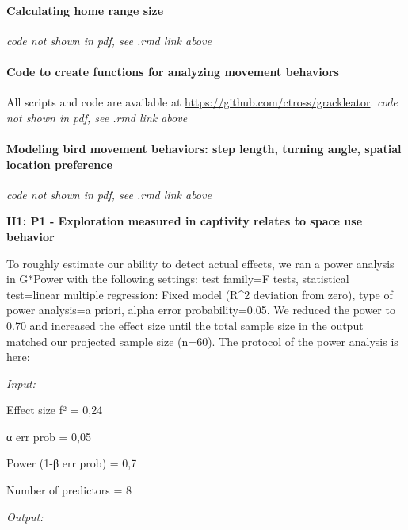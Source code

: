 \documentclass[
]{article}
\begin{document}
\hypertarget{calculating-home-range-size}{%
\paragraph{Calculating home range
size}\label{calculating-home-range-size}}

\emph{code not shown in pdf, see .rmd link above}

\hypertarget{code-to-create-functions-for-analyzing-movement-behaviors}{%
\paragraph{Code to create functions for analyzing movement
behaviors}\label{code-to-create-functions-for-analyzing-movement-behaviors}}

All scripts and code are available at
\url{https://github.com/ctross/grackleator}. \emph{code not shown in
pdf, see .rmd link above}

\hypertarget{modeling-bird-movement-behaviors-step-length-turning-angle-spatial-location-preference}{%
\paragraph{Modeling bird movement behaviors: step length, turning angle,
spatial location
preference}\label{modeling-bird-movement-behaviors-step-length-turning-angle-spatial-location-preference}}

\emph{code not shown in pdf, see .rmd link above}

\textbf{H1: P1 - Exploration measured in captivity relates to space use
behavior}

To roughly estimate our ability to detect actual effects, we ran a power
analysis in G*Power with the following settings: test family=F tests,
statistical test=linear multiple regression: Fixed model (R\^{}2
deviation from zero), type of power analysis=a priori, alpha error
probability=0.05. We reduced the power to 0.70 and increased the effect
size until the total sample size in the output matched our projected
sample size (n=60). The protocol of the power analysis is here:

\emph{Input:}

Effect size f² = 0,24

α err prob = 0,05

Power (1-β err prob) = 0,7

Number of predictors = 8

\emph{Output:}
\end{document}
